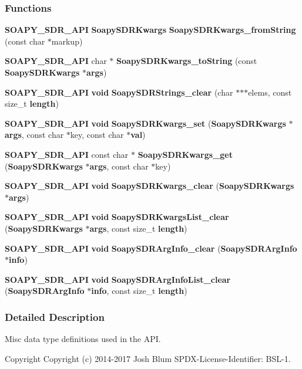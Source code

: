 \subsubsection*{Functions}
\begin{DoxyCompactItemize}
\item 
{\bf S\+O\+A\+P\+Y\+\_\+\+S\+D\+R\+\_\+\+A\+PI} {\bf Soapy\+S\+D\+R\+Kwargs} {\bf Soapy\+S\+D\+R\+Kwargs\+\_\+from\+String} (const char $\ast$markup)
\item 
{\bf S\+O\+A\+P\+Y\+\_\+\+S\+D\+R\+\_\+\+A\+PI} char $\ast$ {\bf Soapy\+S\+D\+R\+Kwargs\+\_\+to\+String} (const {\bf Soapy\+S\+D\+R\+Kwargs} $\ast${\bf args})
\item 
{\bf S\+O\+A\+P\+Y\+\_\+\+S\+D\+R\+\_\+\+A\+PI} {\bf void} {\bf Soapy\+S\+D\+R\+Strings\+\_\+clear} (char $\ast$$\ast$$\ast$elems, const size\+\_\+t {\bf length})
\item 
{\bf S\+O\+A\+P\+Y\+\_\+\+S\+D\+R\+\_\+\+A\+PI} {\bf void} {\bf Soapy\+S\+D\+R\+Kwargs\+\_\+set} ({\bf Soapy\+S\+D\+R\+Kwargs} $\ast${\bf args}, const char $\ast$key, const char $\ast${\bf val})
\item 
{\bf S\+O\+A\+P\+Y\+\_\+\+S\+D\+R\+\_\+\+A\+PI} const char $\ast$ {\bf Soapy\+S\+D\+R\+Kwargs\+\_\+get} ({\bf Soapy\+S\+D\+R\+Kwargs} $\ast${\bf args}, const char $\ast$key)
\item 
{\bf S\+O\+A\+P\+Y\+\_\+\+S\+D\+R\+\_\+\+A\+PI} {\bf void} {\bf Soapy\+S\+D\+R\+Kwargs\+\_\+clear} ({\bf Soapy\+S\+D\+R\+Kwargs} $\ast${\bf args})
\item 
{\bf S\+O\+A\+P\+Y\+\_\+\+S\+D\+R\+\_\+\+A\+PI} {\bf void} {\bf Soapy\+S\+D\+R\+Kwargs\+List\+\_\+clear} ({\bf Soapy\+S\+D\+R\+Kwargs} $\ast${\bf args}, const size\+\_\+t {\bf length})
\item 
{\bf S\+O\+A\+P\+Y\+\_\+\+S\+D\+R\+\_\+\+A\+PI} {\bf void} {\bf Soapy\+S\+D\+R\+Arg\+Info\+\_\+clear} ({\bf Soapy\+S\+D\+R\+Arg\+Info} $\ast${\bf info})
\item 
{\bf S\+O\+A\+P\+Y\+\_\+\+S\+D\+R\+\_\+\+A\+PI} {\bf void} {\bf Soapy\+S\+D\+R\+Arg\+Info\+List\+\_\+clear} ({\bf Soapy\+S\+D\+R\+Arg\+Info} $\ast${\bf info}, const size\+\_\+t {\bf length})
\end{DoxyCompactItemize}


\subsubsection{Detailed Description}
Misc data type definitions used in the A\+PI. 

\begin{DoxyCopyright}{Copyright}
Copyright (c) 2014-\/2017 Josh Blum S\+P\+D\+X-\/\+License-\/\+Identifier\+: B\+S\+L-\/1. 
\end{DoxyCopyright}


